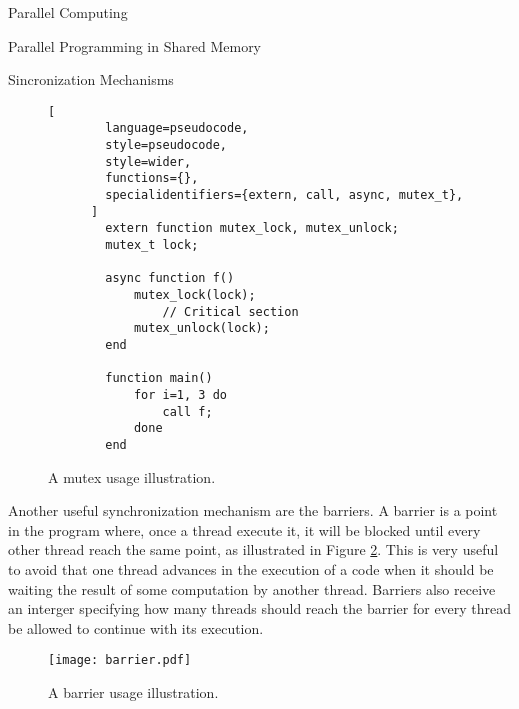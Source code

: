 \begin{section}{Parallel Computing}
\begin{subsection}{Parallel Programming in Shared Memory}
\begin{subsubsection}{Sincronization Mechanisms}
\begin{figure}
      \begin{lstlisting}[
        language=pseudocode,
        style=pseudocode,
        style=wider,
        functions={},
        specialidentifiers={extern, call, async, mutex_t},
      ]
        extern function mutex_lock, mutex_unlock;
        mutex_t lock;

        async function f()
            mutex_lock(lock);
                // Critical section
            mutex_unlock(lock);
        end

        function main()
            for i=1, 3 do
                call f;
            done
        end
      \end{lstlisting}
      \caption{A mutex usage illustration.}
      \label{fig:mutex}
\end{figure}

Another useful synchronization mechanism are the barriers. A barrier
is a point in the program where, once a thread execute it, it will
be blocked until every other thread reach the same point, as illustrated
in Figure \ref{fig:barrier}.
This is very useful to avoid that one thread advances in the execution
of a code when it should be waiting the result of some computation by
another thread. Barriers also receive an interger specifying how many
threads should reach the barrier for every thread be allowed to continue
with its execution.


\begin{figure}[ht]
 \centering
 \texttt{[image: barrier.pdf]}
 \caption{A barrier usage illustration.}
 \label{fig:barrier}
\end{figure}



\end{subsubsection}
\end{subsection}
\end{section}
